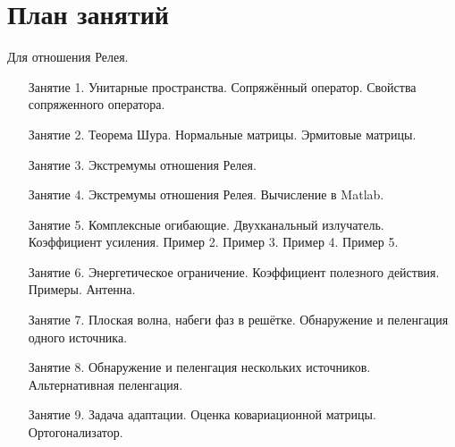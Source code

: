 \chapter{План занятий}

Для отношения Релея.
\begin{itemize}
    \item[Занятие 1.] Унитарные пространства. Сопряжённый оператор. Свойства сопряженного оператора.
    \item[Занятие 2.] Теорема Шура. Нормальные матрицы. Эрмитовые матрицы.
    \item[Занятие 3.] Экстремумы отношения Релея.
    \item[Занятие 4.] Экстремумы отношения Релея. Вычисление в Matlab.
    \item[Занятие 5.] Комплексные огибающие. Двухканальный излучатель. Коэффициент усиления. Пример 2. Пример 3. Пример 4. Пример 5.
    \item[Занятие 6.] Энергетическое ограничение. Коэффициент полезного действия. Примеры. Антенна.
    \item[Занятие 7.] Плоская волна, набеги фаз в решётке. Обнаружение и пеленгация одного источника.
    \item[Занятие 8.] Обнаружение и пеленгация нескольких источников. Альтернативная пеленгация.
    \item[Занятие 9.] Задача адаптации. Оценка ковариационной матрицы. Ортогонализатор.
\end{itemize}